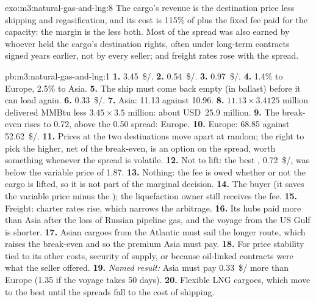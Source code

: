 \begin{solution}{exo:m3:natural-gas-and-lng:8}
The cargo's revenue is the destination price less shipping and regasification, and its
cost is 115\% of  plus the fixed fee paid for the capacity: the margin is the
 less both. Most of the spread was also earned by whoever held the cargo's
destination rights, often under long-term contracts signed years earlier, not by every
seller; and freight rates rose with the spread.
\end{solution}

\begin{solution}{pb:m3:natural-gas-and-lng:1}
\textbf{1.} \qty{3.45}{\$/\mmbtu}. \textbf{2.} \qty{0.54}{\$/\mmbtu}. \textbf{3.}
\qty{0.97}{\$/\mmbtu}. \textbf{4.} 1.4\% to Europe, 2.5\% to Asia. \textbf{5.} The ship
must come back empty (in ballast) before it can load again.
\textbf{6.} \qty{0.33}{\$/\mmbtu}. \textbf{7.} Asia:  \qty{11.13}{} against
\qty{10.96}{}. \textbf{8.} $11.13 \times 3.4125$ million delivered MMBtu less $3.45 \times
3.5$ million: about USD~25.9 million. \textbf{9.} The break-even rises to \qty{0.72}{}, above
the \qty{0.50}{} spread: Europe. \textbf{10.} Europe:  \qty{68.85}{} against
\qty{52.62}{\$/\mmbtu}.
\textbf{11.} Prices at the two destinations move apart at random; the right to pick the
higher, net of the break-even, is an option on the spread, worth something whenever the
spread is volatile. \textbf{12.} Not to lift: the best , \qty{0.72}{\$/\mmbtu}, was
below the variable price of \qty{1.87}{}. \textbf{13.} Nothing: the fee is owed whether or
not the cargo is lifted, so it is not part of the marginal decision. \textbf{14.} The
buyer (it saves the variable price minus the ); the liquefaction owner still
receives the fee. \textbf{15.} Freight: charter rates rise, which narrows the arbitrage.
\textbf{16.} Its hubs paid more than Asia after the loss of Russian pipeline gas, and the
voyage from the US Gulf is shorter. \textbf{17.} Asian cargoes from the Atlantic must sail
the longer route, which raises the break-even and so the premium Asia must pay.
\textbf{18.} For price stability tied to its other costs, security of supply, or because
oil-linked contracts were what the seller offered. \textbf{19.} \emph{Named result:} Asia
must pay \qty{0.33}{\$/\mmbtu} more than Europe (\qty{1.35}{} if the voyage takes 50 days).
\textbf{20.} Flexible LNG cargoes, which move to the best  until the spreads fall to
the cost of shipping.
\end{solution}

